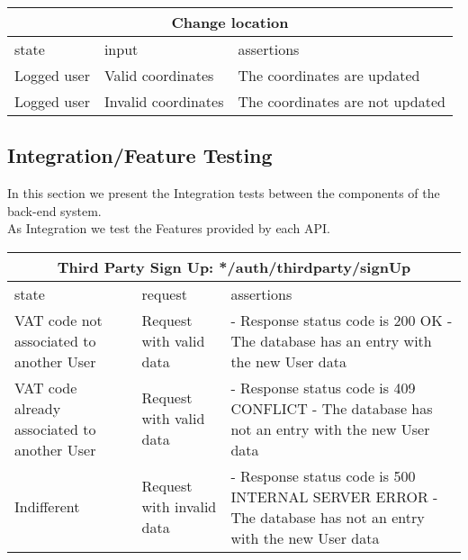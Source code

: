 \begin{center}
	\begin{tabular}{|p{}|p{}|p{}|}
		\hline
		\multicolumn{3}{c}{Change location}\\
		\hline
		state & input & assertions \\
		\hline
		Logged user &
		Valid coordinates& 
		The coordinates are updated \newline
		\\
		\hline
		Logged user &
		Invalid coordinates& 
		The coordinates are not updated \newline
		\\
		\hline
	\end{tabular}
\end{center}

\subsection{Integration/Feature Testing}
In this section we present the Integration tests between the components of the back-end system.\\
As Integration we test the Features provided by each API.\\

\begin{center}
	\begin{tabular}{|p{}|p{}|p{}|}
		\hline
		\multicolumn{3}{c}{Third Party Sign Up: */auth/thirdparty/signUp}\\

		\hline
		state & request & assertions \\
		
		\hline
		VAT code not associated to another User &
		Request with valid data & 
		- Response status code is 200 OK \newline
		- The database has an entry with the new User data
		\\
		
		\hline
		VAT code already associated to another User   &
		Request with valid data & 
		- Response status code is 409 CONFLICT\newline
		- The database has not an entry with the new User data
		\\
		
		\hline
		Indifferent  &
		Request with invalid data & 
		- Response status code is 500 INTERNAL SERVER ERROR\newline
		- The database has not an entry with the new User data
		\\
		
		\hline

	\end{tabular}
\end{center}

